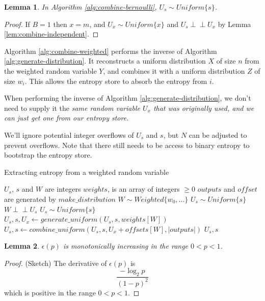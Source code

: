 \documentclass[12pt]{article}
\newtheorem{lemma}{Lemma}
\newcommand{\indep}{\perp\!\!\!\perp}
\begin{document}
\begin{lemma}
In Algorithm \ref{alg:combine-bernoulli}, $U_s \sim Uniform\{s\}$.
\end{lemma}

\begin{proof}
    If $B=1$ then $x=m$, and $U_x \sim Uniform\{x\}$ and $U_s \indep U_x$ by Lemma \ref{lem:combine-independent}.

\end{proof}

Algorithm \ref{alg:combine-weighted} performs the inverse of Algorithm \ref{alg:generate-distribution}. It reconstructs a uniform distribution $X$ of size $n$ from the weighted random variable $Y$, and combines it with a uniform distribution $Z$ of size $w_i$. This allows the entropy store to absorb the entropy from $i$.

When performing the inverse of Algorithm \ref{alg:generate-distribution}, we don't need to supply it the \em same \em random variable $U_x$ that was originally used, and we can just get one from our entropy store.

We'll ignore potential integer overflows of $U_s$ and $s$, but $N$ can be adjusted to prevent overflows. Note that there still needs to be access to binary entropy to bootstrap the entropy store.

\begin{algorithm}
\caption{Extracting entropy from a weighted random variable}
\label{alg:combine-weighted}
\begin{algorithmic}[1]
\Require $U_s$, $s$ and $W$ are integers
\Require $weights$, is an array of integers $\ge 0$
\Require $outputs$ and $offset$ are generated by $make\_distribution$ 
\Require $W \sim Weighted\{w_0, ...\}$
\Require $U_s \sim Uniform\{s\}$
    \Require $W \indep U_s$
\Ensure $U_s \sim Uniform\{s\}$
    \State $U_s, s, U_x \gets generate\_uniform(U_s, s, weights[W])$
    \State $U_s, s \gets combine\_uniform(U_s, s, U_x + offsets[W], |outputs|)$
    \State \Return $U_s, s$
\EndProcedure
\end{algorithmic}
\end{algorithm}

\begin{lemma}
    \label{lem:hloss_monotonic}
    $\epsilon(p)$ is monotonically increasing in the range $0 < p < 1$.
\end{lemma}

\begin{proof}(Sketch) The derivative of $\epsilon(p)$ is
    \begin{equation}
        \frac{-\log_2p}{(1-p)^2}
    \end{equation}
    which is positive in the range $0 < p < 1$.
\end{proof}
\end{document}
